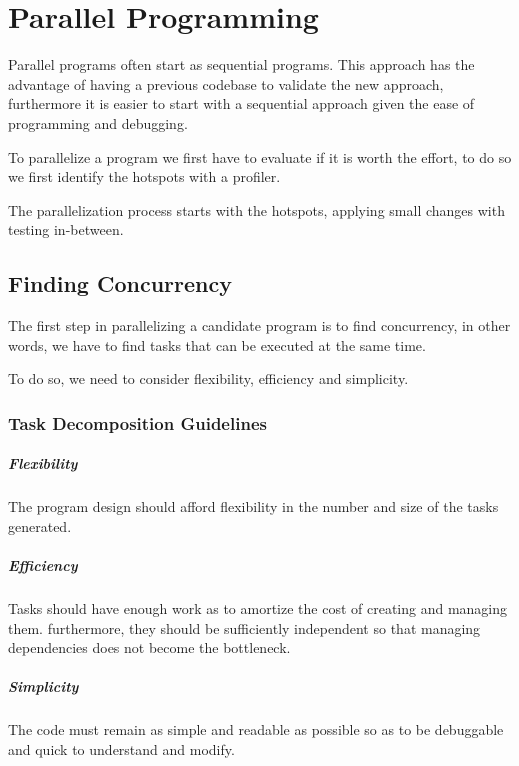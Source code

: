 \chapter{Parallel Programming}

Parallel programs often start as sequential programs.
This approach has the advantage of having a previous codebase to validate the new approach,
furthermore it is easier to start with a sequential approach given the ease of programming and debugging.

To parallelize a program we first have to evaluate if it is worth the effort,
to do so we first identify the hotspots with a profiler.

The parallelization process starts with the hotspots,
applying small changes with testing in-between.

\section{Finding Concurrency}

The first step in parallelizing a candidate program is to find concurrency,
in other words, we have to find tasks that can be executed at the same time.

To do so, we need to consider flexibility, efficiency and simplicity.

\subsection{Task Decomposition Guidelines}

\paragraph{Flexibility}
The program design should afford flexibility in the number and size of the tasks generated.

\paragraph{Efficiency}
Tasks should have enough work as to amortize the cost of creating and managing them.
furthermore, they should be sufficiently independent so that managing dependencies does not become the bottleneck.

\paragraph{Simplicity}
The code must remain as simple and readable as possible so as to be debuggable and quick to understand and modify.

